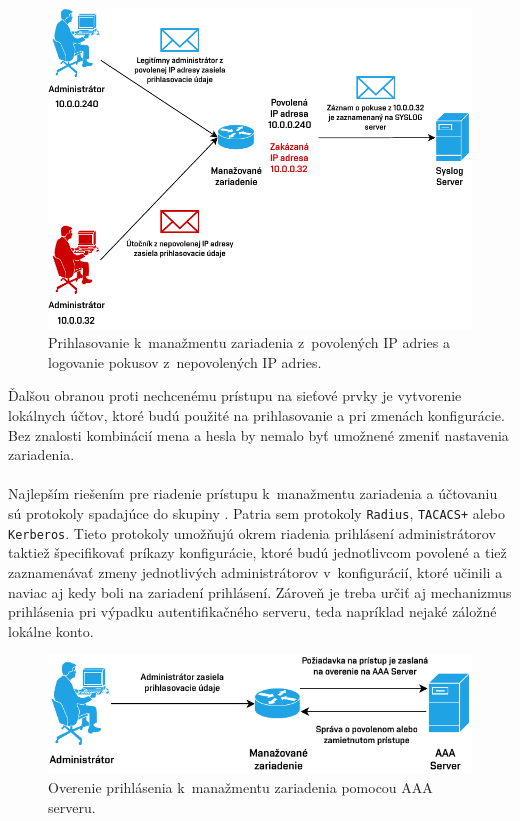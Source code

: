 \begin{figure}[H]
	\begin{center}
		\includegraphics[scale=1]{obrazky/login-log.pdf}
	\end{center}
	\caption[Prihlasovanie k~manažmentu zariadenia]{Prihlasovanie k~manažmentu zariadenia z~povolených IP adries a logovanie pokusov z~nepovolených IP adries.}
	\label{fig:login-log-mngmt}
\end{figure} 

\newpage
Ďalšou obranou proti nechcenému prístupu na sieťové prvky je vytvorenie lokálnych účtov, ktoré budú použité na prihlasovanie a pri zmenách konfigurácie. Bez znalosti kombinácií mena a hesla by nemalo byť umožnené zmeniť nastavenia zariadenia.  
\\\\   
\noindent
Najlepším riešením pre riadenie prístupu k~manažmentu zariadenia a účtovaniu sú protokoly spadajúce do skupiny . Patria sem protokoly \texttt{Radius}, \texttt{TACACS+} alebo \texttt{Kerberos}. Tieto protokoly umožňujú okrem riadenia prihlásení administrátorov taktiež špecifikovať príkazy konfigurácie, ktoré budú jednotlivcom povolené a tiež zaznamenávať zmeny jednotlivých administrátorov v~konfigurácií, ktoré učinili a naviac aj kedy boli na zariadení prihlásení. Zároveň je treba určiť aj mechanizmus prihlásenia pri výpadku autentifikačného serveru, teda napríklad nejaké záložné lokálne konto.

\begin{figure}[H]
	\begin{center}
		\includegraphics[scale=1.1]{obrazky/AAA.pdf}
	\end{center}
	\caption[Manažment zariadenia pomocou AAA]{Overenie prihlásenia k~manažmentu zariadenia pomocou AAA serveru.}
	\label{fig:aaa-mngmt}
\end{figure} 



